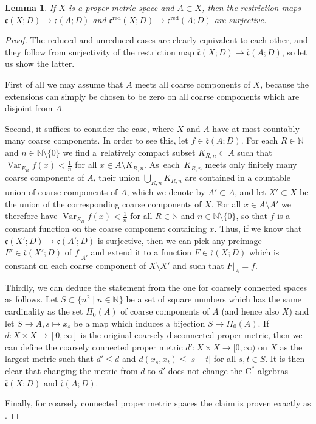 \documentclass[pdftex]{sigma}
\numberwithin{equation}{section}
\newtheorem{lem}[thm]{Lemma}
\theoremstyle{definition}
\newcommand{\N}{\mathbb{N}}
\DeclareMathOperator{\Var}{Var}
\newcommand{\textCstar}{\ensuremath{\mathrm{C}^*\!}}
\newcommand{\sHigCom}{\overline{\mathfrak{c}}}
\newcommand{\sHigCor}{\mathfrak{c}}
\newcommand{\sHigCorRed}{\mathfrak{c}^{\mathrm{red}}}
\newcommand{\coarsecomp}{\Pi_0}
\begin{document}
\begin{lem}\label{lem:Willettssurjectivity}
If $X$ is a proper metric space and $A\subset X$, then the restriction maps \(\sHigCor(X;D)\to\sHigCor(A;D)\) and \(\sHigCorRed(X;D)\to\sHigCorRed(A;D)\) are surjective.
\end{lem}
\begin{proof}
The reduced and unreduced cases are clearly equivalent to each other, and they follow from surjectivity of the restriction map \(\sHigCom(X;D)\to\sHigCom(A;D)\), so let us show the latter.

First of all we may assume that $A$ meets all coarse components of $X$, because the extensions can simply be chosen to be zero on all coarse components which are disjoint from $A$.

Second, it suffices to consider the case, where $X$ and $A$ have at most countably many coarse components. In order to see this, let $f\in \sHigCom(A;D)$. For each $R\in\N$ and $n\in\N\setminus\{0\}$ we find a~relatively compact subset $K_{R,n}\subset A$ such that $\Var_{E_R}f(x)<\frac1n$ for all $x\in A\setminus K_{R,n}$. As~each~$K_{R,n}$ meets only finitely many coarse components of $A$, their union $\bigcup_{R,n}K_{R,n}$ are contained in a countable union of coarse components of $A$, which we denote by $A'\subset A$, and let $X'\subset X$ be the union of the corresponding coarse components of $X$. For all $x\in A\setminus A'$ we therefore have $\Var_{E_R}f(x)<\frac1n$ for all $R\in\N$ and $n\in\N\setminus\{0\}$, so that $f$ is a constant function on the coarse component containing $x$.
Thus, if we know that $\sHigCom(X';D)\to\sHigCom(A';D)$ is surjective, then we can pick any preimage $F'\in\sHigCom(X';D)$ of $f|_{A'}$ and extend it to a function $F\in \sHigCom(X;D)$ which is constant on each coarse component of $X\setminus X'$ and such that $F|_A=f$.

Thirdly, we can deduce the statement from the one for coarsely connected spaces as follows. Let $S\subset \big\{n^2\mid n\in\N\big\}$ be a set of square numbers which has the same cardinality as the set $\coarsecomp(A)$ of coarse components of $A$ (and hence also $X$) and let $S\to A, s\mapsto x_s$ be a map which induces a bijection $S\to \coarsecomp(A)$. If $d\colon X\times X\to [0,\infty]$ is the original coarsely disconnected proper metric, then we can define the coarsely connected proper metric $d'\colon X\times X\to [0,\infty)$ on $X$ as the largest metric such that $d'\leq d$ and $d(x_s,x_{t})\leq |s-t|$ for all $s,t\in S$. It is then clear that changing the metric from $d$ to $d'$ does not change the \textCstar-algebras \(\sHigCom(X;D)\) and \(\sHigCom(A;D)\).

Finally, for coarsely connected proper metric spaces the claim is proven exactly as \cite[Lemma~3.4]{WillettHomological}.
\end{proof}
\end{document}
